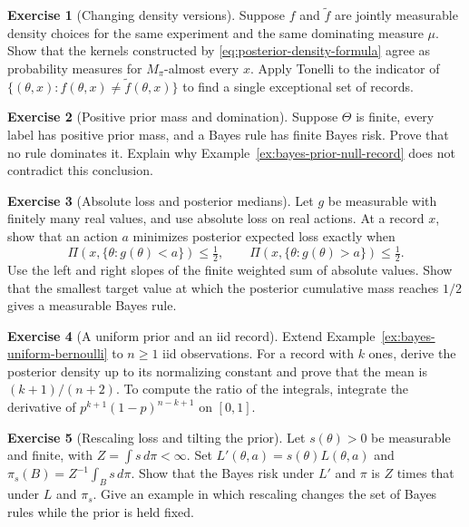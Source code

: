 \documentclass[11pt,oneside]{book}
\theoremstyle{definition}
\newtheorem{exercise}{Exercise}[section]
\theoremstyle{remark}
\begin{document}
\begin{exercise}[Changing density versions]
\label{exer:posterior-density-versions}
Suppose $f$ and $\widetilde f$ are jointly measurable density choices
for the same experiment and the same dominating measure $\mu$.
Show that the kernels constructed by
\eqref{eq:posterior-density-formula} agree as probability measures for
$M_\pi$-almost every $x$. Apply Tonelli to the indicator of
$\{(\theta,x):f(\theta,x)\ne\widetilde f(\theta,x)\}$ to find a single
exceptional set of records.
\end{exercise}

\begin{exercise}[Positive prior mass and domination]
\label{exer:finite-positive-prior-domination}
Suppose $\Theta$ is finite, every label has positive prior mass, and
a Bayes rule has finite Bayes risk. Prove that no rule dominates it.
Explain why Example~\ref{ex:bayes-prior-null-record} does not
contradict this conclusion.
\end{exercise}

\begin{exercise}[Absolute loss and posterior medians]
\label{exer:bayes-absolute-median}
Let $g$ be measurable with finitely many real values, and use absolute
loss on real actions. At a record $x$, show that an action $a$ minimizes posterior
expected loss exactly when
\[
\Pi(x,\{\theta:g(\theta)<a\})\leq\tfrac12,\qquad
\Pi(x,\{\theta:g(\theta)>a\})\leq\tfrac12.
\]
Use the left and right slopes of the finite weighted sum of absolute
values. Show that the smallest target value at which the posterior
cumulative mass reaches $1/2$ gives a measurable Bayes rule.
\end{exercise}

\begin{exercise}[A uniform prior and an iid record]
\label{exer:bayes-uniform-bernoulli-iid}
Extend Example~\ref{ex:bayes-uniform-bernoulli} to $n\geq1$ iid
observations. For a record with $k$ ones, derive the posterior density
up to its normalizing constant and prove that the mean is
$(k+1)/(n+2)$. To compute the ratio of the integrals, integrate the
derivative of $p^{k+1}(1-p)^{n-k+1}$ on $[0,1]$.
\end{exercise}

\begin{exercise}[Rescaling loss and tilting the prior]
\label{exer:bayes-rescaling-prior}
Let $s(\theta)>0$ be measurable and finite, with $Z=\int s\,d\pi<\infty$.
Set $L'(\theta,a)=s(\theta)L(\theta,a)$ and
$\pi_s(B)=Z^{-1}\int_B s\,d\pi$. Show that the Bayes risk under $L'$
and $\pi$ is $Z$ times that under $L$ and $\pi_s$.
Give an example in which rescaling changes the set of Bayes rules
while the prior is held fixed.
\end{exercise}
\end{document}
